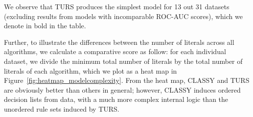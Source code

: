 We observe that TURS produces the simplest model for 13 out 31 datasets (excluding results from models with incomparable ROC-AUC scores), which we denote in bold in the table. 

Further, to illustrate the differences between the number of literals across all algorithms, we calculate a comparative score as follow: for each individual dataset, we divide the minimum total number of literals by the total number of literals of each algorithm, which we plot as a heat map in Figure~\ref{fig:heatmap_modelcomplexity}. From the heat map, CLASSY and TURS are obviously better than others in general; however, CLASSY induces ordered decision lists from data, with a much more complex internal logic than the unordered rule sets induced by TURS. 


